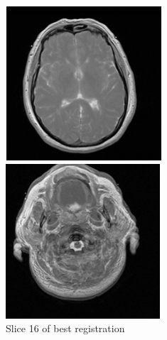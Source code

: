 \documentclass[11pt,english]{article}
\begin{document}
\begin{figure}[h!]
\begin{minipage}[b]{0.22\textwidth}
      \includegraphics[width = \textwidth]{images/TranslationLBFGS.PNG}
      \caption{Slice 16 of best registration}
      \label{fig:versor1LBFGS}
    \end{minipage}
    \begin{minipage}[b]{0.22\textwidth}
        \includegraphics[width = \textwidth]{images/lastInitial.PNG}

\end{minipage}
\end{figure}
\end{document}
